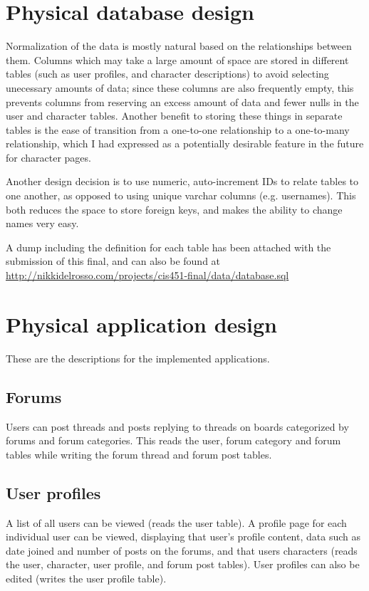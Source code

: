 \documentclass{book}
\begin{document}
\section{Physical database design}
Normalization of the data is mostly natural based on the relationships between them.  Columns which may take a large amount of space are stored in different tables (such as user profiles, and character descriptions) to avoid selecting unecessary amounts of data; since these columns are also frequently empty, this prevents columns from reserving an excess amount of data and fewer nulls in the user and character tables.  Another benefit to storing these things in separate tables is the ease of transition from a one-to-one relationship to a one-to-many relationship, which I had expressed as a potentially desirable feature in the future for character pages.

Another design decision is to use numeric, auto-increment IDs to relate tables to one another, as opposed to using unique varchar columns (e.g. usernames).  This both reduces the space to store foreign keys, and makes the ability to change names very easy.

A dump including the definition for each table has been attached with the submission of this final, and can also be found at \\ \url{http://nikkidelrosso.com/projects/cis451-final/data/database.sql}

\section{Physical application design}
These are the descriptions for the implemented applications.
\subsection{Forums}
Users can post threads and posts replying to threads on boards categorized by forums and forum categories.  This reads the user, forum category and forum tables while writing the forum thread and forum post tables.

\subsection{User profiles}
A list of all users can be viewed (reads the user table).  A profile page for each individual user can be viewed, displaying that user's profile content, data such as date joined and number of posts on the forums, and that users characters (reads the user, character, user profile, and forum post tables).  User profiles can also be edited (writes the user profile table).
\end{document}
